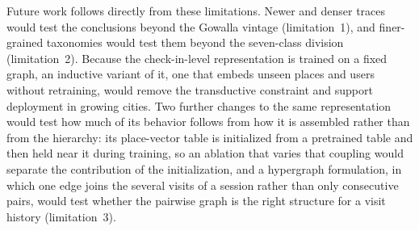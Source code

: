 Future work follows directly from these limitations. Newer and denser traces would
test the conclusions beyond the Gowalla vintage (limitation~1), and finer-grained
taxonomies would test them beyond the seven-class division (limitation~2). Because the
check-in-level representation is trained on a fixed graph, an inductive variant of it,
one that embeds unseen places and users without retraining, would remove the
transductive constraint and support deployment in growing cities. Two further changes to
the same representation would test how much of its behavior follows from how it is
assembled rather than from the hierarchy: its place-vector table is initialized from a
pretrained table and then held near it during training, so an ablation that varies that
coupling would separate the contribution of the initialization, and a hypergraph
formulation, in which one edge joins the several visits of a session rather than only
consecutive pairs, would test whether the pairwise graph is the right structure for a
visit history (limitation~3).
